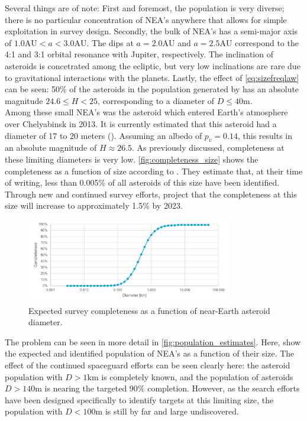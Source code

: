 Several things are of note: First and foremost, the population is very diverse; there is no particular concentration of NEA's anywhere that allows for simple exploitation in survey design. Secondly, the bulk of NEA's has a semi-major axis of $1.0 \mathrm{AU} < a < 3.0 \mathrm{AU}$. The dips at $a = 2.0 \mathrm{AU}$ and $a = 2.5 \mathrm{AU}$ correspond to the 4:1 and 3:1 orbital resonance with Jupiter, respectively. The inclination of asteroids is concetrated among the ecliptic, but very low inclinations are rare due to gravitational interactions with the planets. Lastly, the effect of \autoref{eq:sizefreqlaw} can be seen: 50\% of the asteroids in the population generated by \cite{GranvikPopulation} has an absolute magnitude $24.6 \leq H < 25$, corresponding to a diameter of $D \leq 40 \mathrm{m}$. \\

Among these small NEA's was the asteroid which entered Earth's atmosphere over Chelyabinsk in 2013. It is currently estimated that this asteroid had a diameter of 17 to 20 meters (\cite{ChelyabinskNASA}). Assuming an albedo of $p_v = 0.14$, this results in an absolute magnitude of $H \approx 26.5$. As previously discussed, completeness at these limiting diameters is very low. \autoref{fig:completeness_size} shows the completeness as a function of size according to \cite{HarrisPopulation}. They estimate that, at their time of writing, less than 0.005\% of all asteroids of this size have been identified. Through new and continued survey efforts, \cite{2017NEOSDT} project that the completeness at this size will increase to approximately 1.5\% by 2023. \\

\begin{figure}[htbp]
 \centering
 \includegraphics[width=0.8\textwidth]{img/completeness_size.pdf}
 \caption{Expected survey completeness as a function of near-Earth asteroid diameter. \cite{HarrisPopulation}}
 \label{fig:completeness_size}
\end{figure}

The problem can be seen in more detail in \autoref{fig:population_estimates}. Here, \cite{HarrisPopulation} show the expected and identified population of NEA's as a function of their size. The effect of the continued spaceguard efforts can be seen clearly here: the asteroid population with $D > 1 \mathrm{km}$ is completely known, and the population of asteroids $D > 140 \mathrm{m}$ is nearing the targeted 90\% completion. However, as the search efforts have been designed specifically to identify targets at this limiting size, the population with $D < 100 \mathrm{m}$ is still by far and large undiscovered.

